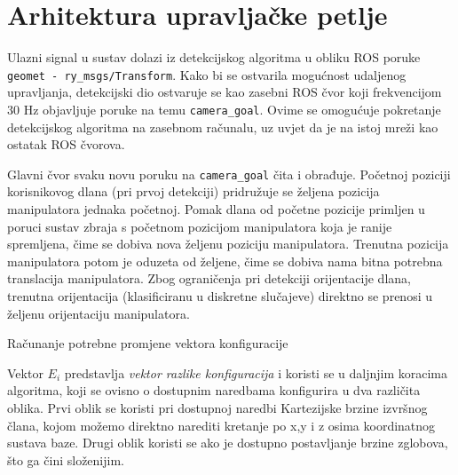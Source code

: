 \documentclass[times, utf8, diplomski, numeric]{fer}
\begin{document}
\section{Arhitektura upravljačke petlje}\label{arhitektura}
Ulazni signal u sustav dolazi iz detekcijskog algoritma u obliku ROS poruke \texttt{geomet - ry\_msgs/Transform}.
Kako bi se ostvarila mogućnost udaljenog upravljanja, detekcijski dio ostvaruje se kao zasebni ROS čvor koji frekvencijom 30 Hz objavljuje poruke na temu \texttt{camera\_goal}.
Ovime se omogućuje pokretanje detekcijskog algoritma na zasebnom računalu, uz uvjet da je na istoj mreži kao ostatak ROS čvorova.

Glavni čvor svaku novu poruku na \texttt{camera\_goal} čita i obrađuje.
Početnoj poziciji korisnikovog dlana (pri prvoj detekciji) pridružuje se željena pozicija manipulatora jednaka početnoj.
Pomak dlana od početne pozicije primljen u poruci sustav zbraja s početnom pozicijom manipulatora koja je ranije spremljena, čime se dobiva nova željenu poziciju manipulatora.
Trenutna pozicija manipulatora potom je oduzeta od željene, čime se dobiva nama bitna potrebna translacija manipulatora.
Zbog ograničenja pri detekciji orijentacije dlana, trenutna orijentacija (klasificiranu u diskretne slučajeve) direktno se prenosi u željenu orijentaciju manipulatora.

\begin{algorithm}[H]
\caption{Računanje potrebne promjene vektora konfiguracije}
\begin{algorithmic}
\ENDIF
{}
\ENDIF
{}
\ENDFOR
\end{algorithmic}
\end{algorithm}

Vektor $E_i$ predstavlja \textit{vektor razlike konfiguracija} i koristi se u daljnjim koracima algoritma, koji se ovisno o dostupnim naredbama konfigurira u dva različita oblika.
Prvi oblik se koristi pri dostupnoj naredbi Kartezijske brzine izvršnog člana, kojom možemo direktno narediti kretanje po x,y i z osima koordinatnog sustava baze.
Drugi oblik koristi se ako je dostupno postavljanje brzine zglobova, što ga čini složenijim.
\end{document}
